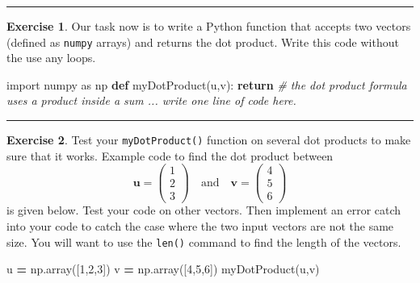 \documentclass[
]{book}
\newenvironment{Shaded}{\begin{snugshade}}{\end{snugshade}}
\newcommand{\CommentTok}[1]{\textcolor[rgb]{0.56,0.35,0.01}{\textit{#1}}}
\newcommand{\ControlFlowTok}[1]{\textcolor[rgb]{0.13,0.29,0.53}{\textbf{#1}}}
\newcommand{\DecValTok}[1]{\textcolor[rgb]{0.00,0.00,0.81}{#1}}
\newcommand{\ImportTok}[1]{#1}
\newcommand{\KeywordTok}[1]{\textcolor[rgb]{0.13,0.29,0.53}{\textbf{#1}}}
\newcommand{\NormalTok}[1]{#1}
\newcommand{\OperatorTok}[1]{\textcolor[rgb]{0.81,0.36,0.00}{\textbf{#1}}}
\theoremstyle{definition}
\theoremstyle{definition}
\theoremstyle{definition}
\newtheorem{exercise}{Exercise}[chapter]
\theoremstyle{remark}
\begin{document}
\begin{center}\rule{0.5\linewidth}{0.5pt}\end{center}

\begin{exercise}
\protect\hypertarget{exr:unnamed-chunk-292}{}{\label{exr:unnamed-chunk-292} }Our task now is to write a Python function that accepts two vectors (defined as \texttt{numpy} arrays) and returns the dot product. Write this code without the use any loops.
\end{exercise}

\begin{Shaded}
\begin{Highlighting}[]
\ImportTok{import}\NormalTok{ numpy }\ImportTok{as}\NormalTok{ np}
\KeywordTok{def}\NormalTok{ myDotProduct(u,v):}
    \ControlFlowTok{return} \CommentTok{\# the dot product formula uses a product inside a sum ... write one line of code here.}
\end{Highlighting}
\end{Shaded}

\begin{center}\rule{0.5\linewidth}{0.5pt}\end{center}

\begin{exercise}
\protect\hypertarget{exr:unnamed-chunk-294}{}{\label{exr:unnamed-chunk-294} }Test your \texttt{myDotProduct()} function on several dot products to make sure that it works. Example code to find the dot product between
\[ \boldsymbol{u} = \begin{pmatrix} 1 \\ 2\\ 3\end{pmatrix} \quad \text{and} \quad \boldsymbol{v} = \begin{pmatrix} 4\\5\\6\end{pmatrix} \]
is given below. Test your code on other vectors. Then implement an error catch into your code to catch the case where the two input vectors are not the same size. You will want to use the \texttt{len()} command to find the length of the vectors.
\end{exercise}

\begin{Shaded}
\begin{Highlighting}[]
\NormalTok{u }\OperatorTok{=}\NormalTok{ np.array([}\DecValTok{1}\NormalTok{,}\DecValTok{2}\NormalTok{,}\DecValTok{3}\NormalTok{])}
\NormalTok{v }\OperatorTok{=}\NormalTok{ np.array([}\DecValTok{4}\NormalTok{,}\DecValTok{5}\NormalTok{,}\DecValTok{6}\NormalTok{])}
\NormalTok{myDotProduct(u,v)}
\end{Highlighting}
\end{Shaded}
\end{document}
